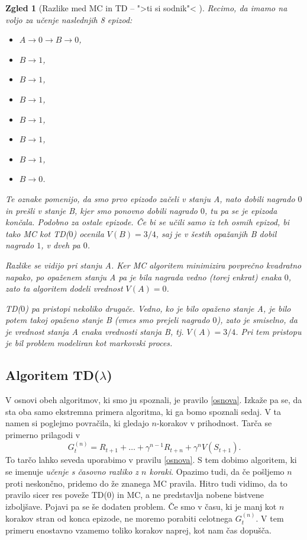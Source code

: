 \documentclass[12pt,a4paper]{amsart}
\theoremstyle{definition} %
\theoremstyle{plain} %
\newtheorem{zgled}[definicija]{Zgled}
\begin{document}
\begin{zgled}[Razlike med MC in TD -- ">ti si sodnik"< \cite{RLintro}]
    Recimo, da imamo na voljo za učenje naslednjih 8 epizod:
    \begin{multicols}{2}
    \begin{itemize}
        \item $A \rightarrow 0 \rightarrow B \rightarrow 0$,
        \item $B \rightarrow 1$,
        \item $B \rightarrow 1$,
        \item $B \rightarrow 1$,
        \item $B \rightarrow 1$,
        \item $B \rightarrow 1$,
        \item $B \rightarrow 1$,
        \item $B \rightarrow 0$.
    \end{itemize}
    \end{multicols} 
    Te oznake pomenijo, da smo prvo epizodo začeli v stanju A, nato dobili nagrado $0$ in prešli v 
    stanje B, kjer smo ponovno dobili nagrado $0$, tu pa se je epizoda končala. Podobno za ostale 
    epizode. Če bi se učili samo iz teh osmih epizod, bi tako MC kot TD($0$) ocenila $V(B) = 3/4$, 
    saj je v šestih opažanjih B dobil nagrado $1$, v dveh pa $0$.

    Razlike se vidijo pri stanju A. Ker MC algoritem minimizira povprečno kvadratno napako, po opaženem 
    stanju A pa je bila nagrada vedno (torej enkrat) enaka $0$, zato ta algoritem dodeli vrednost 
    $V(A) = 0$.

    TD($0$) pa pristopi nekoliko drugače. Vedno, ko je bilo opaženo stanje A, je bilo potem takoj 
    opaženo stanje B (vmes smo prejeli nagrado $0$), zato je smiselno, da je vrednost stanja A 
    enaka vrednosti stanja B, tj. $V(A) = 3/4$. Pri tem pristopu je bil problem modeliran kot 
    markovski proces.
\end{zgled}

\subsection{Algoritem TD($\lambda$)}
V osnovi obeh algoritmov, ki smo ju spoznali, je pravilo \eqref{osnova}. Izkaže pa se, da sta oba 
samo ekstremna primera algoritma, ki ga bomo spoznali sedaj. V ta namen si poglejmo povračila, 
ki gledajo $n$-korakov v prihodnost. Tarča se primerno prilagodi v
$$
G_t^{(n)} = R_{t+1} + \dots + \gamma^{n-1} R_{t+n} + \gamma^n V(S_{t+1}).
$$
To tarčo lahko seveda uporabimo v pravilu \eqref{osnova}. S tem dobimo algoritem, ki se imenuje 
\textit{učenje s časovno razliko z $n$ koraki}. Opazimo tudi, da če pošljemo $n$ proti neskončno, 
pridemo do že znanega MC pravila. Hitro tudi vidimo, da to pravilo sicer res poveže TD($0$) in 
MC, a ne predstavlja nobene bistvene izboljšave. Pojavi pa se še dodaten problem. Če smo v času, ki
je manj kot $n$ korakov stran od konca epizode, ne moremo porabiti celotnega $G_t^{(n)}$. V tem 
primeru enostavno vzamemo toliko korakov naprej, kot nam čas dopušča. 
\end{document}
